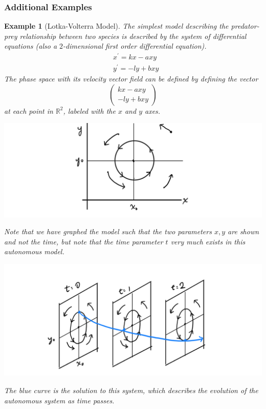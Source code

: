 \documentclass{article}
\newtheorem{example}{Example}[section]
\theoremstyle{remark}
\theoremstyle{definition}
\begin{document}
    \subsubsection{Additional Examples}

      \begin{example}[Lotka-Volterra Model]
      The simplest model describing the predator-prey relationship between two species is described by the system of differential equations (also a $2$-dimensional first order differential equation). 
      \begin{align*}
          & x^\prime = k x - a x y \\
          & y^\prime = - l y + b x y
      \end{align*} 
      The phase space with its velocity vector field can be defined by defining the vector 
      \[\begin{pmatrix}
      kx - axy \\ -ly + bxy
      \end{pmatrix}\]
      at each point in $\mathbb{R}^2$, labeled with the $x$ and $y$ axes. 
      \begin{center}
          \includegraphics[scale=0.25]{img/Lotka_Volterra.PNG}
      \end{center}
      Note that we have graphed the model such that the two parameters $x, y$ are shown and not the time, but note that the time parameter $t$ very much exists in this autonomous model. 
      \begin{center}
          \includegraphics[scale=0.25]{img/Lotka_Autonomous.PNG}
      \end{center}
      The blue curve is the solution to this system, which describes the evolution of the autonomous system as time passes. 
      \end{example}
\end{document}
